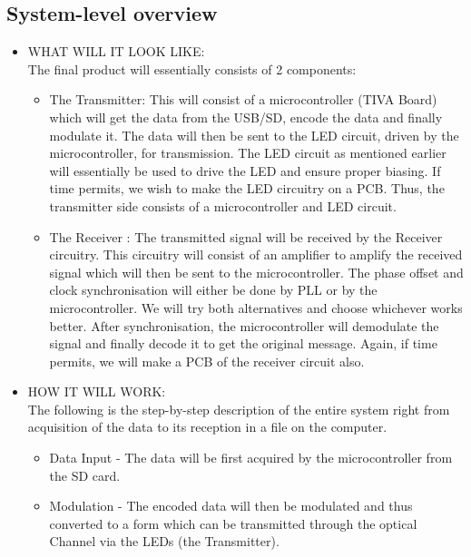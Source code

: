 \documentclass{article}
\begin{document}
\subsection{System-level overview}
\begin{itemize}
\item WHAT WILL IT LOOK LIKE:\\
  The final product will essentially consists of 2 components:
  \begin{itemize}
  \item The Transmitter: This will consist of a microcontroller (TIVA Board) which will get the data from the USB/SD, encode the data and finally modulate it. The data will then be sent to the LED circuit, driven by the microcontroller, for transmission. The LED circuit as mentioned earlier will essentially be used to drive the LED and ensure proper biasing. If time permits, we wish to make the LED circuitry on a PCB. Thus, the transmitter side consists of a microcontroller and LED circuit.
  \item The Receiver : The transmitted signal will be received by the Receiver circuitry. This circuitry will consist of an amplifier to amplify the received signal which will then be sent to the microcontroller. The phase offset and clock synchronisation will either be done by PLL or by the microcontroller. We will try both alternatives and choose whichever works better. After synchronisation, the microcontroller will demodulate the signal and finally decode it to get the original message. Again, if time permits, we will make a PCB of the receiver circuit also.
  \end{itemize}
\item HOW IT WILL WORK:\\
  The following is the step-by-step description of the entire system right from acquisition of the data to its reception in a file on the computer.
  \begin{itemize}
  \item Data Input - The data will be first acquired by the microcontroller from the SD card. 
  \item Modulation - The encoded data will then be modulated and thus converted to a form which can be transmitted through the optical Channel via the LEDs (the Transmitter).

\end{itemize}
\end{itemize}
\end{document}
